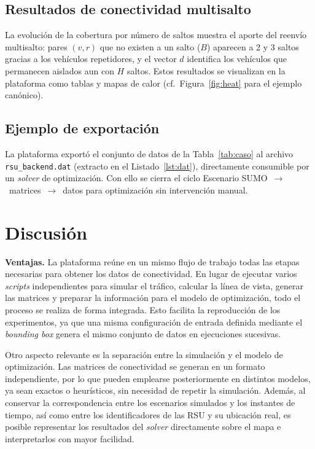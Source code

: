 \documentclass[smartcities,article,submit,oneauthor]{Definitions/mdpi}
\begin{document}
\subsection{Resultados de conectividad multisalto}
La evolución de la cobertura por número de saltos muestra el aporte del reenvío
multisalto: pares $(v,r)$ que no existen a un salto ($B$) aparecen a 2 y 3 saltos
gracias a los vehículos repetidores, y el vector $d$ identifica los vehículos que
permanecen aislados aun con $H$ saltos. Estos resultados se visualizan en la
plataforma como tablas y mapas de calor (cf.\ Figura~\ref{fig:heat} para el ejemplo
canónico).

\subsection{Ejemplo de exportación}
La plataforma exportó el conjunto de datos de la Tabla~\ref{tab:caso} al archivo
\texttt{rsu\_backend.dat} (extracto en el Listado~\ref{lst:dat}), directamente
consumible por un \emph{solver} de optimización. Con ello se cierra el ciclo
Escenario SUMO~$\rightarrow$~matrices~$\rightarrow$~datos para optimización sin
intervención manual.

\section{Discusión}

\textbf{Ventajas.} La plataforma reúne en un mismo flujo de trabajo todas las etapas
necesarias para obtener los datos de conectividad. En lugar de ejecutar varios
\emph{scripts} independientes para simular el tráfico, calcular la línea de vista,
generar las matrices y preparar la información para el modelo de optimización, todo
el proceso se realiza de forma integrada. Esto facilita la reproducción de los
experimentos, ya que una misma configuración de entrada definida mediante el
\emph{bounding box} genera el mismo conjunto de datos en ejecuciones sucesivas.

Otro aspecto relevante es la separación entre la simulación y el modelo de
optimización. Las matrices de conectividad se generan en un formato independiente,
por lo que pueden emplearse posteriormente en distintos modelos, ya sean exactos o
heurísticos, sin necesidad de repetir la simulación. Además, al conservar la
correspondencia entre los escenarios simulados y los instantes de tiempo, así como
entre los identificadores de las RSU y su ubicación real, es posible representar los
resultados del \emph{solver} directamente sobre el mapa e interpretarlos con mayor
facilidad.
\end{document}

